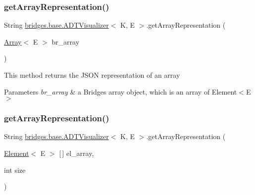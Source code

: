 \subsubsection{\texorpdfstring{get\+Array\+Representation()}{getArrayRepresentation()}\hspace{0.1cm}{\footnotesize\ttfamily [1/2]}}
{\footnotesize\ttfamily String \hyperlink{classbridges_1_1base_1_1_a_d_t_visualizer}{bridges.\+base.\+A\+D\+T\+Visualizer}$<$ K, E $>$.get\+Array\+Representation (\begin{DoxyParamCaption}\item[{\hyperlink{classbridges_1_1base_1_1_array}{Array}$<$ E $>$}]{br\+\_\+array }\end{DoxyParamCaption})}

This method returns the J\+S\+ON representation of an array


\begin{DoxyParams}{Parameters}
{\em br\+\_\+array} & a Bridges array object, which is an array of Element$<$\+E$>$ \\
\hline
\end{DoxyParams}
\hypertarget{classbridges_1_1base_1_1_a_d_t_visualizer_ad44bb58d6f9c630cc6bbcae175003243}{}\label{classbridges_1_1base_1_1_a_d_t_visualizer_ad44bb58d6f9c630cc6bbcae175003243} 
\subsubsection{\texorpdfstring{get\+Array\+Representation()}{getArrayRepresentation()}\hspace{0.1cm}{\footnotesize\ttfamily [2/2]}}
{\footnotesize\ttfamily String \hyperlink{classbridges_1_1base_1_1_a_d_t_visualizer}{bridges.\+base.\+A\+D\+T\+Visualizer}$<$ K, E $>$.get\+Array\+Representation (\begin{DoxyParamCaption}\item[{\hyperlink{classbridges_1_1base_1_1_element}{Element}$<$ E $>$ \mbox{[}$\,$\mbox{]}}]{el\+\_\+array,  }\item[{int}]{size }\end{DoxyParamCaption})}

\hypertarget{classbridges_1_1base_1_1_a_d_t_visualizer_a43eeb9f3321477f58edc3aff52631f3b}{}\label{classbridges_1_1base_1_1_a_d_t_visualizer_a43eeb9f3321477f58edc3aff52631f3b} 

